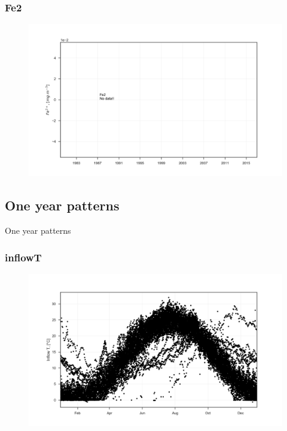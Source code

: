 \documentclass{beamer}
\begin{document}
\begin{frame}
\frametitle{Fe2}
\begin{figure}
\includegraphics[width=\textwidth]{rivers/all/all_years/Fe2.png}
\end{figure}
\end{frame}

\subsection{One year patterns}

\begin{frame}
\begin{center}
\Huge One year patterns
\end{center}
\end{frame}

\begin{frame}
\frametitle{inflowT}
\begin{figure}
\includegraphics[width=\textwidth]{rivers/all/1yr_graph/inflowT.png}
\end{figure}
\end{frame}
\end{document}
